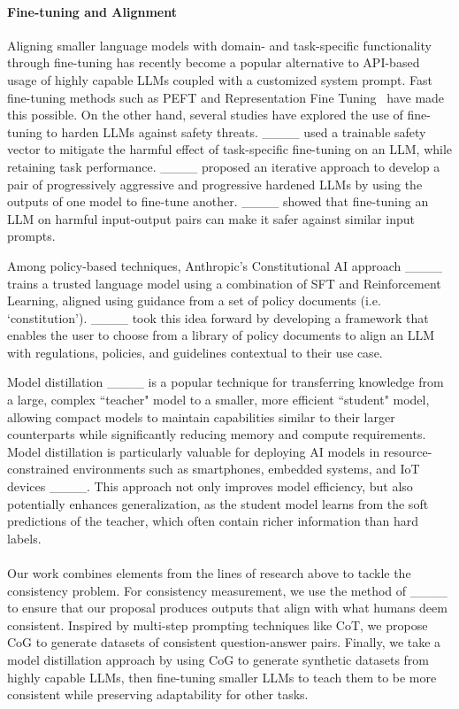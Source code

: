 \paragraph{Fine-tuning and Alignment}
Aligning smaller language models with domain- and task-specific functionality through fine-tuning has recently become a popular alternative to API-based usage of highly capable LLMs coupled with a customized system prompt. Fast fine-tuning methods such as PEFT and Representation Fine Tuning~\cite[ReFT]{wu2024reft} have made this possible. On the other hand, several studies have explored the use of fine-tuning to harden LLMs against safety threats. ____ used a trainable safety vector to mitigate the harmful effect of task-specific fine-tuning on an LLM, while retaining task performance. ____ proposed an iterative approach to develop a pair of progressively aggressive and progressive hardened LLMs by using the outputs of one model to fine-tune another. ____ showed that fine-tuning an LLM on harmful input-output pairs can make it safer against similar input prompts.

Among policy-based techniques, Anthropic's Constitutional AI approach ____ trains a trusted language model using a combination of SFT and Reinforcement Learning, aligned using guidance from a set of policy documents (i.e. `constitution'). ____ took this idea forward by developing a framework that enables the user to choose from a library of policy documents to align an LLM with regulations, policies, and guidelines contextual to their use case.

Model distillation ____ is a popular technique for transferring knowledge from a large, complex ``teacher" model to a smaller, more efficient ``student" model, allowing compact models to maintain capabilities similar to their larger counterparts while significantly reducing memory and compute requirements. Model distillation is particularly valuable for deploying AI models in resource-constrained environments such as smartphones, embedded systems, and IoT devices ____. This approach not only improves model efficiency, but also potentially enhances generalization, as the student model learns from the soft predictions of the teacher, which often contain richer information than hard labels.

\paragraph{}
Our work combines elements from the lines of research above to tackle the consistency problem. For consistency measurement, we use the method of ____ to ensure that our proposal produces outputs that align with what humans deem consistent. Inspired by multi-step prompting techniques like CoT, we propose CoG to generate datasets of consistent question-answer pairs. Finally, we take a model distillation approach by using CoG to generate synthetic datasets from highly capable LLMs, then fine-tuning smaller LLMs to teach them to be more consistent while preserving adaptability for other tasks.



